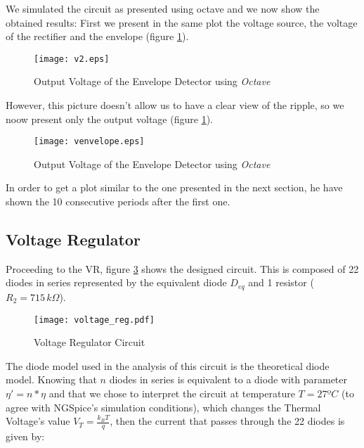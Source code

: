 We simulated the circuit as presented using octave and we now show the obtained results:
First we present in the same plot the voltage source, the voltage of the rectifier and the envelope (figure \ref{fig:venvelope1}).
\begin{figure}[h!]
  \centering
  \texttt{[image: v2.eps]}
  \caption{Output Voltage of the Envelope Detector using \emph{Octave}}
  \label{fig:venvelope1}
\end{figure}
However, this picture doesn't allow us to have a clear view of the ripple, so we noow present only the output voltage (figure \ref{fig:venvelope1}).
\begin{figure}[H]
  \centering
  \texttt{[image: venvelope.eps]}
  \caption{Output Voltage of the Envelope Detector using \emph{Octave}}
  \label{fig:venvelope2}
\end{figure}
In order to get a plot similar to the one presented in the next section, he have shown the 10 consecutive periods after the first one.







\subsection{Voltage Regulator}

Proceeding to the VR, figure \ref{fig:voltage regulator} shows the designed circuit. This is composed of 22 diodes in series represented by the equivalent diode $D_{eq}$ and 1 resistor ($R_2=715 \, k\Omega$).
\begin{figure}[h!]
  \centering
  \texttt{[image: voltage\_reg.pdf]}
  \caption{Voltage Regulator Circuit}
  \label{fig:voltage regulator}
\end{figure}

The diode model used in the analysis of this circuit is the theoretical diode model. Knowing that $n$ diodes in series is equivalent to a diode with parameter $\eta'=n*\eta$ and that we chose to
interpret the circuit at temperature $T=27ºC$ (to agree with NGSpice's simulation conditions), which changes the Thermal Voltage's value $V_T=\frac{k_BT}{q}$, then the current that passes through the 22 diodes is given by:

